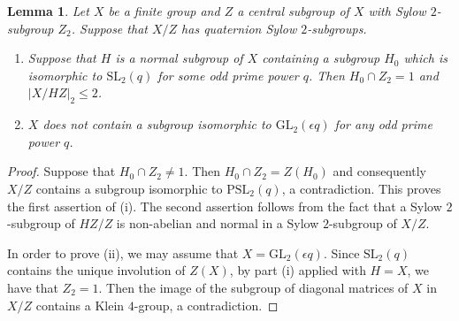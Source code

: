 \documentclass{amsart}
\theoremstyle{plain}\newtheorem{Theorem}{Theorem}[section]
\theoremstyle{plain}\newtheorem{Conjecture}[Theorem]{Conjecture}
\theoremstyle{plain}\newtheorem{Corollary}[Theorem]{Corollary}
\theoremstyle{plain}\newtheorem{Lemma}[Theorem]{Lemma}
\theoremstyle{plain}\newtheorem{Proposition}[Theorem]{Proposition}
\theoremstyle{definition}\newtheorem{Definition}[Theorem]{Definition}
\theoremstyle{definition}\newtheorem{Example}[Theorem]{Example}
\theoremstyle{definition}\newtheorem{Examples}[Theorem]{Examples}
\theoremstyle{definition}\newtheorem{Exercise}[Theorem]{Exercise}
\theoremstyle{definition}\newtheorem{Notation}[Theorem]{Notation}
\theoremstyle{definition}\newtheorem{Remark}[Theorem]{Remark}
\theoremstyle{definition}\newtheorem{Remarks}[Theorem]{Remarks}
\def\GL{\mathrm{GL}}
\def\PSL{\mathrm{PSL}}
\def\SL{\mathrm{SL}}
\numberwithin{equation}{section}
\begin{document}
\begin{Lemma}\label{lem:noGL2}
Let $ X$ be  a  finite group and $Z$ a  central subgroup of  $X$ with Sylow $2$-subgroup $Z_2$. Suppose that $X/Z$ has quaternion Sylow $2$-subgroups.
\begin{enumerate}
    \item [(i)] Suppose that $H$  is a normal subgroup of  $X$   containing   a subgroup  $H_0$  which  is isomorphic to   $\SL_2(q)$  for some odd prime power $q$. Then $H_0\cap Z_2 =1$  and $|X/HZ|_2\leq 2$.
    \item [(ii)]$X$ does not contain  a  subgroup isomorphic   to $\GL_2(\epsilon q) $ for any odd prime power $q$.
\end{enumerate}
\end{Lemma}

\begin{proof}  
 Suppose that $H_0 \cap Z_2 \ne 1$. Then  $H_0 \cap Z_2 =Z(H_0) $  and  consequently $X/Z$  contains a subgroup  isomorphic to $\PSL_2(q)$, a  contradiction. This proves the first assertion of (i). The second assertion follows  from the fact that  a  Sylow $2$-subgroup of  $HZ/Z$  is non-abelian and  normal  in a Sylow $2$-subgroup of $X/Z$.    

 In order to prove (ii), we may assume that $X=\GL_2(\epsilon q) $. Since $\SL_2(q)$  contains the unique involution  of  $Z(X)$,  by  part (i)  applied with $H=X$, we have that $Z_2 =1$. Then  the  image of   the subgroup of diagonal matrices  of $X$ in $X/Z$ contains a   Klein $4$-group, a contradiction.
 \end{proof}
\end{document}
